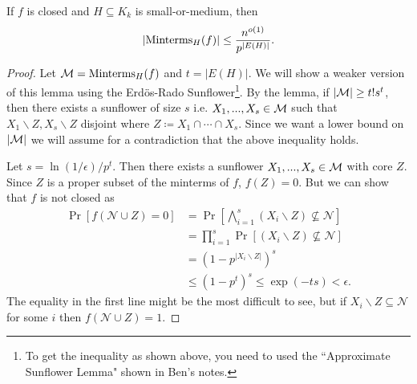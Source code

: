 \documentclass[11pt]{article}
\begin{document}
	\begin{lemma}
	 	\label{lem:UB-MintermsIsomorphicH}
	 	If $f$ is closed and $H \subseteq K_k$ is small-or-medium, then
	 	\[|\mathrm{Minterms}_H(f)| \leq \frac{n^{o(1)}}{p^{|E(H)|}}.\]
	\end{lemma}
	\begin{proof}
		Let $\mathcal{M} = \mathrm{Minterms}_H(f)$ and $t = |E(H)|$. We will show a weaker version of this lemma using the Erd\"{o}s-Rado Sunflower\footnote{To get the inequality as shown above, you need to used the ``Approximate Sunflower Lemma" shown in Ben's notes.}. By the lemma, if $|\mathcal{M}| \geq t!s^t$, then there exists a sunflower of size $s$ i.e. $X_1, ..., X_s \in \mathcal{M}$ such that $X_1\backslash Z, X_s\backslash Z$ disjoint where $Z \coloneqq X_1 \cap \cdots \cap X_s$. Since we want a lower bound on $|\mathcal{M}|$ we will assume for a contradiction that the above inequality holds. 
		
		Let $s = \ln(1/\epsilon)/p^{t}$. Then there exists a sunflower $X_1, ..., X_s \in \mathcal{M}$ with core $Z$. Since $Z$ is a proper subset of the minterms of $f$, $f(Z) = 0$. But we can show that $f$ is not closed as
		\begin{align*}
			\Pr[f(\mathcal{N}\cup Z) = 0] &= \Pr\left[\bigwedge_{i = 1}^{s}(X_i\backslash Z) \not\subseteq \mathcal{N}\right]\\
			 &= \prod_{i = 1}^{s}\Pr[(X_i\backslash Z) \not\subseteq \mathcal{N}]\\
			 &= \left(1 - p^{|X_i \backslash Z|}\right)^s\\
			 &\leq \left(1 - p^{t}\right)^s \leq \exp(-ts) < \epsilon. 
		\end{align*}
		The equality in the first line might be the most difficult to see, but if $X_i \backslash Z \subseteq \mathcal{N}$ for some $i$ then $f(\mathcal{N} \cup Z) = 1$. 
	\end{proof}
 	
\end{document}
